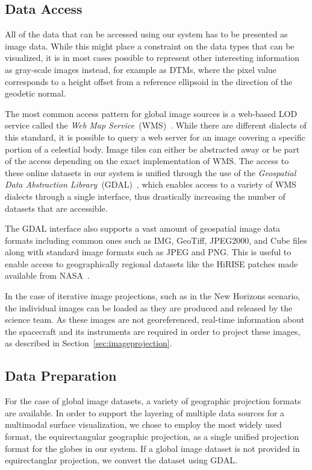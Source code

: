 \documentclass[journal]{vgtc}                %
\begin{document}
\subsection{Data Access} \label{sec:dataaccess}
All of the data that can be accessed using our system has to be presented as image data.
While this might place a constraint on the data types that can be visualized, it is in most cases possible to represent other interesting information as gray-scale images instead, for example as DTMs, where the pixel value corresponds to a height offset from a reference ellipsoid in the direction of the geodetic normal.

The most common access pattern for global image sources is a web-based LOD service called the \emph{Web Map Service}~(WMS)~\cite{open2006opengis, maso2010opengis}.
While there are different dialects of this standard, it is possible to query a web server for an image covering a specific portion of a celestial body. Image tiles can either be abstracted away or be part of the access depending on the exact implementation of WMS.
The access to these online datasets in our system is unified through the use of the \emph{Geospatial Data Abstraction Library}~(GDAL)~\cite{warmerdam2008geospatial}, which enables access to a variety of WMS dialects through a single interface, thus drastically increasing the number of datasets that are accessible.

The GDAL interface also supports a vast amount of geospatial image data formats including common ones such as IMG, GeoTiff, JPEG2000, and Cube files along with standard image formats such as JPEG and PNG. This is useful to enable access to geographically regional datasets like the HiRISE patches made available from NASA~\cite{mcewen2016people}.

In the case of iterative image projections, such as in the New Horizons scenario, the individual images can be loaded as they are produced and released by the science team.
As these images are not georeferenced, real-time information about the spacecraft and its instruments are required in order to project these images, as described in Section~\ref{sec:imageprojection}.

\subsection{Data Preparation} \label{sec:processing}
For the case of global image datasets, a variety of geographic projection formats are available.
In order to support the layering of multiple data sources for a multimodal surface visualization, we chose to employ the most widely used format, the equirectangular geographic projection, as a single unified projection format for the globes in our system.
If a global image dataset is not provided in equirectanglar projection, we convert the dataset using GDAL.
\end{document}
